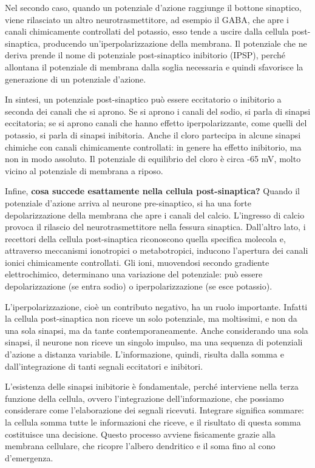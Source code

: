 \documentclass[12pt,a4paper,openany]{book}
\begin{document}
Nel secondo caso, quando un potenziale d'azione raggiunge il bottone sinaptico, viene rilasciato un altro neurotrasmettitore, ad esempio il GABA, che apre i canali chimicamente controllati del potassio, esso tende a uscire dalla cellula post-sinaptica, producendo un'iperpolarizzazione della membrana. Il potenziale che ne deriva prende il nome di potenziale post-sinaptico inibitorio (IPSP), perché allontana il potenziale di membrana dalla soglia necessaria e quindi sfavorisce la generazione di un potenziale d'azione.

In sintesi, un potenziale post-sinaptico può essere eccitatorio o inibitorio a seconda dei canali che si aprono. Se si aprono i canali del sodio, si parla di sinapsi eccitatoria; se si aprono canali che hanno effetto iperpolarizzante, come quelli del potassio, si parla di sinapsi inibitoria. Anche il cloro partecipa in alcune sinapsi chimiche con canali chimicamente controllati: in genere ha effetto inibitorio, ma non in modo assoluto. Il potenziale di equilibrio del cloro è circa -65 mV, molto vicino al potenziale di membrana a riposo.

Infine, \textbf{cosa succede esattamente nella cellula post-sinaptica? }Quando il potenziale d'azione arriva al neurone pre-sinaptico, si ha una forte depolarizzazione della membrana che apre i canali del calcio. L'ingresso di calcio provoca il rilascio del neurotrasmettitore nella fessura sinaptica. Dall'altro lato, i recettori della cellula post-sinaptica riconoscono quella specifica molecola e, attraverso meccanismi ionotropici o metabotropici, inducono l'apertura dei canali ionici chimicamente controllati. Gli ioni, muovendosi secondo gradiente elettrochimico, determinano una variazione del potenziale: può essere depolarizzazione (se entra sodio) o iperpolarizzazione (se esce potassio).

L'iperpolarizzazione, cioè un contributo negativo, ha un ruolo importante. Infatti la cellula post-sinaptica non riceve un solo potenziale, ma moltissimi, e non da una sola sinapsi, ma da tante contemporaneamente. Anche considerando una sola sinapsi, il neurone non riceve un singolo impulso, ma una sequenza di potenziali d'azione a distanza variabile. L'informazione, quindi, risulta dalla somma e dall'integrazione di tanti segnali eccitatori e inibitori.

L'esistenza delle sinapsi inibitorie è fondamentale, perché interviene nella terza funzione della cellula, ovvero l'integrazione dell'informazione, che possiamo considerare come l'elaborazione dei segnali ricevuti. Integrare significa sommare: la cellula somma tutte le informazioni che riceve, e il risultato di questa somma costituisce una decisione. Questo processo avviene fisicamente grazie alla membrana cellulare, che ricopre l'albero dendritico e il soma fino al cono d'emergenza.
\end{document}

